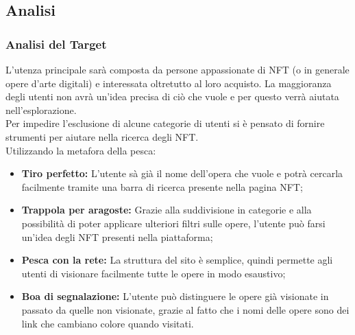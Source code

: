\documentclass[10pt]{article}
\begin{document}
\subsection{Analisi}
\subsubsection{Analisi del Target}
L'utenza principale sarà composta da persone appassionate di NFT (o in generale opere d'arte digitali) e interessata oltretutto al loro acquisto.
La maggioranza degli utenti non avrà un'idea precisa di ciò che vuole e per questo verrà aiutata nell'esplorazione.\\
Per impedire l'esclusione di alcune categorie di utenti si è pensato di fornire strumenti per aiutare nella ricerca degli NFT.\\
Utilizzando la metafora della pesca:
\begin{itemize}
    \item \textbf{Tiro perfetto:} L'utente sà già il nome dell'opera che vuole e potrà cercarla facilmente tramite una barra di ricerca presente nella pagina NFT;
    \item \textbf{Trappola per aragoste:} Grazie alla suddivisione in categorie e alla possibilità di poter applicare ulteriori filtri sulle opere, l'utente può farsi un'idea degli NFT presenti nella piattaforma;
    \item \textbf{Pesca con la rete:} La struttura del sito è semplice, quindi permette agli utenti di visionare facilmente tutte le opere in modo esaustivo;
    \item \textbf{Boa di segnalazione:} L'utente può distinguere le opere già visionate in passato da quelle non visionate, grazie al fatto che i nomi delle opere sono dei link che cambiano colore quando visitati.
\end{itemize}
\end{document}
